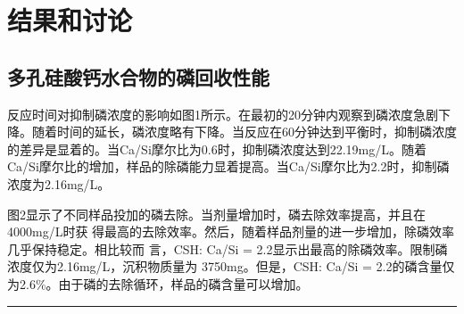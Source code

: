 \documentclass[11pt]{article}
\begin{document}
\section{结果和讨论}
\label{sec:org284a800}
\subsection{多孔硅酸钙水合物的磷回收性能}
\label{sec:org17ca30e}
\setlength{\parindent}{1.0cm}
反应时间对抑制磷浓度的影响如图1所示。在最初的20分钟内观察到磷浓度急剧下降。随着时间的延长，磷浓度略有下降。当反应在60分钟达到平衡时，抑制磷浓度的差异是显着的。当Ca/Si摩尔比为0.6时，抑制磷浓度达到22.19mg/L。随着Ca/Si摩尔比的增加，样品的除磷能力显着提高。当Ca/Si摩尔比为2.2时，抑制磷浓度为2.16mg/L。
\par

\setlength{\parindent}{1.0cm}
图2显示了不同样品投加的磷去除。当剂量增加时，磷去除效率提高，并且在4000mg/L时获
得最高的去除效率。然后，随着样品剂量的进一步增加，除磷效率几乎保持稳定。相比较而
言，CSH: Ca/Si = 2.2显示出最高的除磷效率。限制磷浓度仅为2.16mg/L，沉积物质量为
3750mg。但是，CSH: Ca/Si = 2.2的磷含量仅为2.6\%。由于磷的去除循环，样品的磷含量可以增加。
\par


\noindent\rule{\textwidth}{0.5pt}
\end{document}

